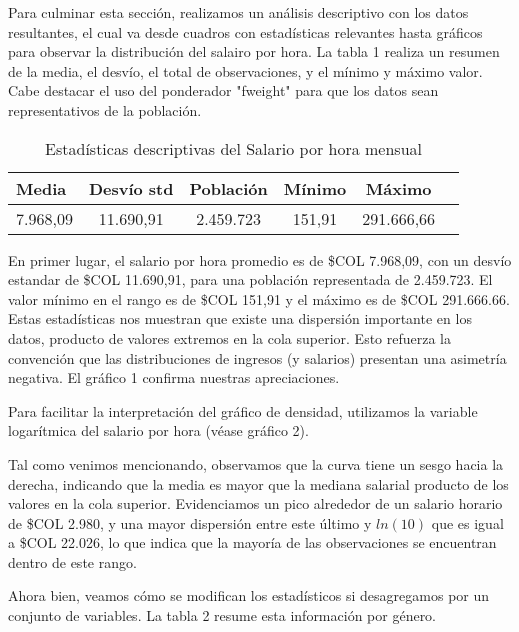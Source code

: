 \documentclass[11pt,oneside]{article}
\begin{document}
	Para culminar esta sección, realizamos un análisis descriptivo con los datos resultantes, el cual va desde cuadros con estadísticas relevantes hasta gráficos para observar la distribución del salairo por hora. La tabla 1 realiza un resumen de la media, el desvío, el total de observaciones, y el mínimo y máximo valor. Cabe destacar el uso del ponderador "fweight" para que los datos sean representativos de la población.
	
	\begin{table}[H]
		\centering
		\begin{tabular}{lccccc}
			\hline
			\textbf{Media} & \textbf{Desvío std} & \textbf{Población} & \textbf{Mínimo} & \textbf{Máximo} \\ \hline
			7.968,09 & 11.690,91 & 2.459.723 & 151,91 & 291.666,66 \\ \hline
		\end{tabular}
		\caption{Estadísticas descriptivas del Salario por hora mensual}
		\label{tab:estadisticas}
	\end{table}
	
	En primer lugar, el salario por hora promedio es de \$COL 7.968,09, con un desvío estandar de \$COL 11.690,91, para una población representada de 2.459.723. El valor mínimo en el rango es de \$COL 151,91 y el máximo es de \$COL 291.666.66. Estas estadísticas nos muestran que existe una dispersión importante en los datos, producto de valores extremos en la cola superior. Esto refuerza la convención que las distribuciones de ingresos (y salarios) presentan una asimetría negativa. El gráfico 1 confirma nuestras apreciaciones.
	
	
	Para facilitar la interpretación del gráfico de densidad, utilizamos la variable logarítmica del salario por hora (véase gráfico 2).
	
	
	Tal como venimos mencionando, observamos que la curva tiene un sesgo hacia la derecha, indicando que la media es mayor que la mediana salarial producto de los valores en la cola superior. Evidenciamos un pico alrededor de un salario horario de \$COL 2.980, y una mayor dispersión entre este último y $ln(10)$ que es igual a \$COL 22.026, lo que indica que la mayoría de las observaciones se encuentran dentro de este rango. 
	
	Ahora bien, veamos cómo se modifican los estadísticos si desagregamos por un conjunto de variables. La tabla 2 resume esta información por género. 
	
\end{document}
